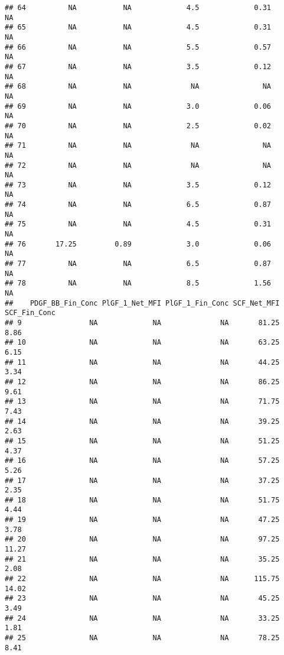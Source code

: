 \documentclass[]{article}
\begin{document}
\begin{verbatim}
## 64          NA           NA             4.5             0.31              NA
## 65          NA           NA             4.5             0.31              NA
## 66          NA           NA             5.5             0.57              NA
## 67          NA           NA             3.5             0.12              NA
## 68          NA           NA              NA               NA              NA
## 69          NA           NA             3.0             0.06              NA
## 70          NA           NA             2.5             0.02              NA
## 71          NA           NA              NA               NA              NA
## 72          NA           NA              NA               NA              NA
## 73          NA           NA             3.5             0.12              NA
## 74          NA           NA             6.5             0.87              NA
## 75          NA           NA             4.5             0.31              NA
## 76       17.25         0.89             3.0             0.06              NA
## 77          NA           NA             6.5             0.87              NA
## 78          NA           NA             8.5             1.56              NA
##    PDGF_BB_Fin_Conc PlGF_1_Net_MFI PlGF_1_Fin_Conc SCF_Net_MFI SCF_Fin_Conc
## 9                NA             NA              NA       81.25         8.86
## 10               NA             NA              NA       63.25         6.15
## 11               NA             NA              NA       44.25         3.34
## 12               NA             NA              NA       86.25         9.61
## 13               NA             NA              NA       71.75         7.43
## 14               NA             NA              NA       39.25         2.63
## 15               NA             NA              NA       51.25         4.37
## 16               NA             NA              NA       57.25         5.26
## 17               NA             NA              NA       37.25         2.35
## 18               NA             NA              NA       51.75         4.44
## 19               NA             NA              NA       47.25         3.78
## 20               NA             NA              NA       97.25        11.27
## 21               NA             NA              NA       35.25         2.08
## 22               NA             NA              NA      115.75        14.02
## 23               NA             NA              NA       45.25         3.49
## 24               NA             NA              NA       33.25         1.81
## 25               NA             NA              NA       78.25         8.41

\end{verbatim}
\end{document}
